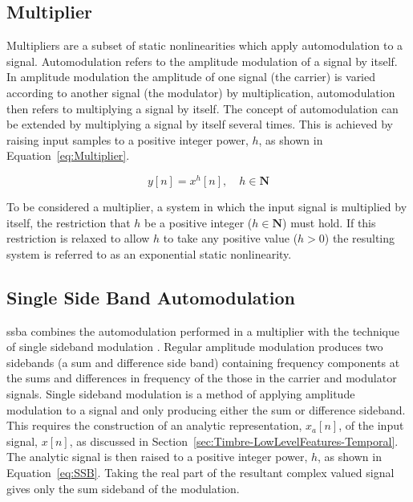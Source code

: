 	\subsection{Multiplier}
	\label{sec:Excitation-Methods-Multiplier}
		Multipliers are a subset of static nonlinearities which apply automodulation to a signal. Automodulation
		refers to the amplitude modulation of a signal by itself. In amplitude modulation the amplitude of one
		signal (the carrier) is varied according to another signal (the modulator) by multiplication,
		automodulation then refers to multiplying a signal by itself. The concept of automodulation can be extended
		by multiplying a signal by itself several times. This is achieved by raising input samples to a positive
		integer power, $h$, as shown in Equation~\ref{eq:Multiplier}.

		\begin{equation}
			y[n] = x^{h}[n], \quad h \in \textbf{N}
			\label{eq:Multiplier}
		\end{equation}

		To be considered a multiplier, a system in which the input signal is multiplied by itself, the restriction
		that $h$ be a positive integer ($h \in \textbf{N}$) must hold. If this restriction is relaxed to allow $h$
		to take any positive value ($h > 0$) the resulting system is referred to as an exponential static
		nonlinearity.

	\subsection{Single Side Band Automodulation}
	\label{sec:Excitation-Methods-SSBA}
		\acrfull{ssba} combines the automodulation performed in a multiplier with the technique of single sideband
		modulation \citep{corinthios2009signals}. Regular amplitude modulation produces two sidebands (a sum and
		difference side band) containing frequency components at the sums and differences in frequency of the those
		in the carrier and modulator signals. Single sideband modulation is a method of applying amplitude
		modulation to a signal and only producing either the sum or difference sideband. This requires the
		construction of an analytic representation, $x_{a}[n]$, of the input signal, $x[n]$, as discussed in
		Section~\ref{sec:Timbre-LowLevelFeatures-Temporal}. The analytic signal is then raised to a positive
		integer power, $h$, as shown in Equation~\ref{eq:SSB}. Taking the real part of the resultant complex valued
		signal gives only the sum sideband of the modulation.


